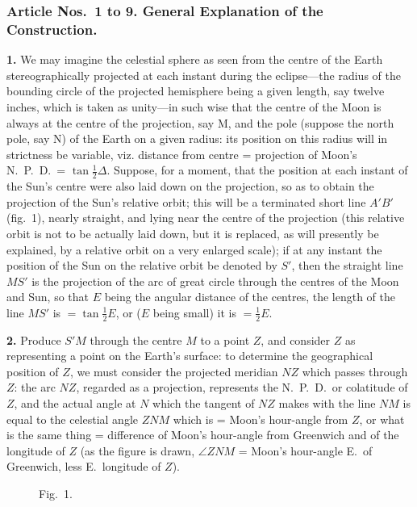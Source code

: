 \documentclass[11pt,a4paper]{article}
\begin{document}
\subsubsection*{Article Nos.\ 1 to 9. General Explanation of the Construction.}

\noindent\textbf{1.} We may imagine the celestial sphere as seen from the centre of the Earth stereographically projected at each instant during the eclipse---the radius of the bounding circle of the projected hemisphere being a given length, say twelve inches, which is taken as unity---in such wise that the centre of the Moon is always at the centre of the projection, say M, and the pole (suppose the north pole, say N) of the Earth on a given radius: its position on this radius will in strictness be variable, viz. distance from centre = projection of Moon's N.\ P.\ D.\ = $\tan \tfrac{1}{2}\Delta$. Suppose, for a moment, that the position at each instant of the Sun's centre were also laid down on the projection, so as to obtain the projection of the Sun's relative orbit; this will be a terminated short line $A'B'$ (fig.~1), nearly straight, and lying near the centre of the projection (this relative orbit is not to be actually laid down, but it is replaced, as will presently be explained, by a relative orbit on a very enlarged scale); if at any instant the position of the Sun on the relative orbit be denoted by $S'$, then the straight line $MS'$ is the projection of the arc of great circle through the centres of the Moon and Sun, so that $E$ being the angular distance of the centres, the length of the line $MS'$ is $= \tan \tfrac{1}{2}E$, or ($E$ being small) it is $= \tfrac{1}{2}E$.

\noindent\textbf{2.} Produce $S'M$ through the centre $M$ to a point $Z$, and consider $Z$ as representing a point on the Earth's surface: to determine the geographical position of $Z$, we must consider the projected meridian $NZ$ which passes through $Z$: the arc $NZ$, regarded as a projection, represents the N.\ P.\ D.\ or colatitude of $Z$, and the actual angle at $N$ which the tangent of $NZ$ makes with the line $NM$ is equal to the celestial angle $ZNM$ which is = Moon's hour-angle from $Z$, or what is the same thing = difference of Moon's hour-angle from Greenwich and of the longitude of $Z$ (as the figure is drawn, $\angle ZNM$ = Moon's hour-angle E.\ of Greenwich, less E.\ longitude of $Z$).

\begin{figure}[H]
\centering
\caption*{Fig.~1.}
\end{figure}
\end{document}
